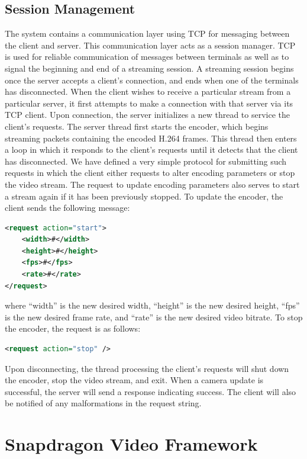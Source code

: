 \documentclass[a4paper,12pt]{article}
\begin{document}
\subsection{Session Management}

The system contains a communication layer using TCP for messaging between the client and server. This communication layer acts as a session manager. TCP is used for reliable communication of messages between terminals as well as to signal the beginning and end of a streaming session. A streaming session begins once the server accepts a client's connection, and ends when one of the terminals has disconnected. When the client wishes to receive a particular stream from a particular server, it first attempts to make a connection with that server via its TCP client. Upon connection, the server initializes a new thread to service the client’s requests. The server thread first starts the encoder, which begins streaming packets containing the encoded H.264 frames. This thread then enters a loop in which it responds to the client's requests until it detects that the client has disconnected. We have defined a very simple protocol for submitting such requests in which the client either requests to alter encoding parameters or stop the video stream. The request to update encoding parameters also serves to start a stream again if it has been previously stopped. To update the encoder, the client sends the following message:
%
\begin{lstlisting}[language=xml, frame=single]
<request action="start">
	<width>#</width>
	<height>#</height>
	<fps>#</fps>
	<rate>#</rate>
</request>
\end{lstlisting}
where ``width'' is the new desired width, ``height'' is the new desired height, ``fps'' is the new desired frame rate, and ``rate'' is the new desired video bitrate. To stop the encoder, the request is as follows:
%
\begin{lstlisting}[language=xml, frame=single]
<request action="stop" />
\end{lstlisting}
Upon disconnecting, the thread processing the client's requests will shut down the encoder, stop the video stream, and exit. When a camera update is successful, the server will send a response indicating success. The client will also be notified of any malformations in the request string.


\section{Snapdragon Video Framework}
\label{sec:Snapdragon}
\end{document}
